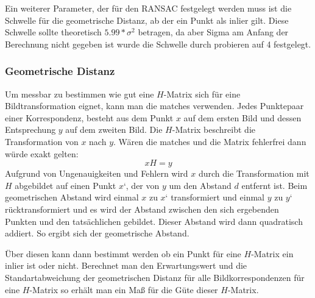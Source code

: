 Ein weiterer Parameter, der für den RANSAC festgelegt werden muss ist die Schwelle für die geometrische Distanz, ab der ein Punkt als inlier gilt. Diese Schwelle sollte theoretisch $5.99*\sigma ^2$ betragen, da aber Sigma am Anfang der Berechnung nicht gegeben ist wurde die Schwelle durch probieren auf 4 festgelegt.

\subsubsection{Geometrische Distanz}
Um messbar zu bestimmen wie gut eine $H$-Matrix sich für eine Bildtransformation eignet, kann man die matches verwenden. Jedes Punktepaar einer Korrespondenz, besteht aus dem Punkt $x$ auf dem ersten Bild und dessen Entsprechung $y$ auf dem zweiten Bild. Die $H$-Matrix beschreibt die Transformation von $x$ nach $y$. Wären die matches und die Matrix fehlerfrei dann würde exakt gelten:
$$x H= y$$
Aufgrund von Ungenauigkeiten und Fehlern wird $x$ durch die Transformation mit $H$ abgebildet auf einen Punkt $x‘$, der von $y$ um den Abstand $d$ entfernt ist. Beim geometrischen Abstand wird einmal $x$ zu $x‘$ transformiert und einmal $y$ zu $ y‘$ rücktransformiert und es wird der Abstand zwischen den sich ergebenden Punkten und den tatsächlichen gebildet. Dieser Abstand wird dann quadratisch addiert. So ergibt sich der geometrische Abstand. 

Über diesen kann dann bestimmt werden ob ein Punkt für eine $H$-Matrix ein inlier ist oder nicht. Berechnet man den Erwartungswert und die Standartabweichung der geometrischen Distanz für alle Bildkorrespondenzen für eine $H$-Matrix so erhält man ein Maß für die Güte dieser $H$-Matrix.

